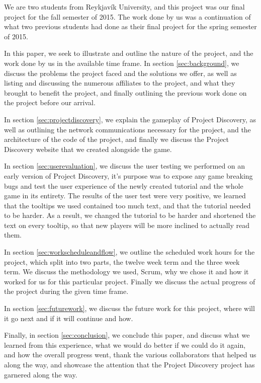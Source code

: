 We are two students from Reykjavík University, and this project was our final project for the fall semester of 2015. The work done by us was a continuation of what two previous students had done as their final project for the spring semester of 2015. 

In this paper, we seek to illustrate and outline the nature of the project, and the work done by us in the available time frame. In section \ref{sec:background}, we discuss the problems the project faced and the solutions we offer, as well as listing and discussing the numerous affiliates to the project, and what they brought to benefit the project, and finally outlining the previous work done on the project before our arrival. 

In section \ref{sec:projectdiscovery}, we explain the gameplay of Project Discovery, as well as outlining the network communications necessary for the project, and the architecture of the code of the project, and finally we discuss the Project Discovery website that we created alongside the game. 

In section \ref{sec:userevaluation}, we discuss the user testing we performed on an early version of Project Discovery, it's purpose was to expose any game breaking bugs and test the user experience of the newly created tutorial and the whole game in its entirety. The results of the user test were very positive, we learned that the tooltips we used contained too much text, and that the tutorial needed to be harder. As a result, we changed the tutorial to be harder and shortened the text on every tooltip, so that new players will be more inclined to actually read them.

In section \ref{sec:workscheduleandflow}, we outline the scheduled work hours for the project, which split into two parts, the twelve week term and the three week term. We discuss the methodology we used, Scrum, why we chose it and how it worked for us for this particular project. Finally we discuss the actual progress of the project during the given time frame.

In section \ref{sec:futurework}, we discuss the future work for this project, where will it go next and if it will continue and how.

Finally, in section \ref{sec:conclusion}, we conclude this paper, and discuss what we learned from this experience, what we would do better if we could do it again, and how the overall progress went, thank the various collaborators that helped us along the way, and showcase the attention that the Project Discovery project has garnered along the way.